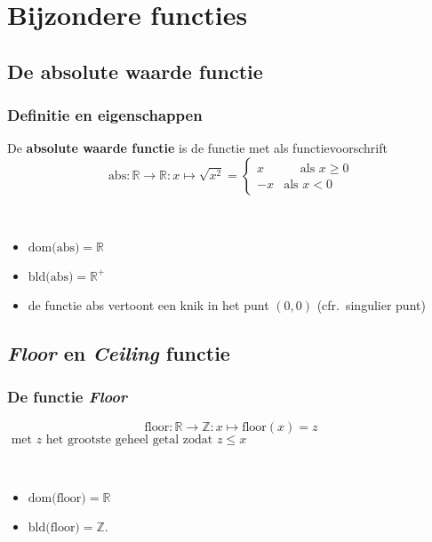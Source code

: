 \section{Bijzondere functies}
\frame{\tableofcontents[currentsection]}

\subsection{De absolute waarde functie}
\begin{frame}
\frametitle{Definitie en eigenschappen}
\pause
\begin{definitie}
De {\bf absolute waarde functie} is de functie met als functievoorschrift
\[\mbox{abs}:\mathbb{R}\rightarrow \mathbb{R}:x\mapsto \sqrt{x^2}=\left\{\begin{array}{rr} x& ~~~~~~ \mbox{als } x\geq 0\\-x&\mbox{als } x<0 \end{array}\right.\]
\end{definitie}
~\\
\pause
\begin{eigenschap}
\begin{itemize}
\item<+-> $\mbox{dom(abs)}=\mathbb{R}$
\item<+-> $\mbox{bld(abs)}=\mathbb{R}^{+}$
\item<+-> de functie abs vertoont een knik in het punt $(0,0)$ (cfr.\ singulier punt)
\end{itemize}
\end{eigenschap}
\end{frame}

\subsection{{\em Floor\/} en {\em Ceiling\/} functie}
\begin{frame}
\frametitle{De functie {\em Floor\/}}
\pause
\begin{definitie}
\[\mbox{floor}:\mathbb{R}\rightarrow \mathbb{Z}:x\mapsto \mbox{floor}(x)=z\] 
$\mbox{ met } z \mbox{ het grootste geheel getal zodat } z\leq x$
\end{definitie}
~\\
\pause
\begin{eigenschap}
\pause
\begin{itemize}
\item<+-> $\mbox{dom(floor)}=\mathbb{R}$
\item<+->$\mbox{bld(floor)}=\mathbb{Z}$.
\end{itemize}
\end{eigenschap}
\end{frame}

